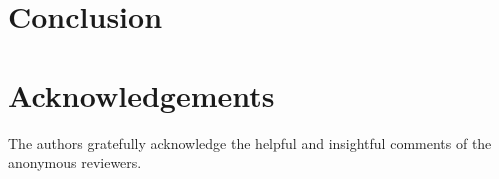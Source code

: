 \documentclass[twoside,11pt]{article} %
\begin{document}
%

\section{Conclusion}
\label{sec:conclusion}



\section*{Acknowledgements}

The authors gratefully acknowledge the helpful and insightful comments of the
anonymous reviewers.

%


%
\end{document}
